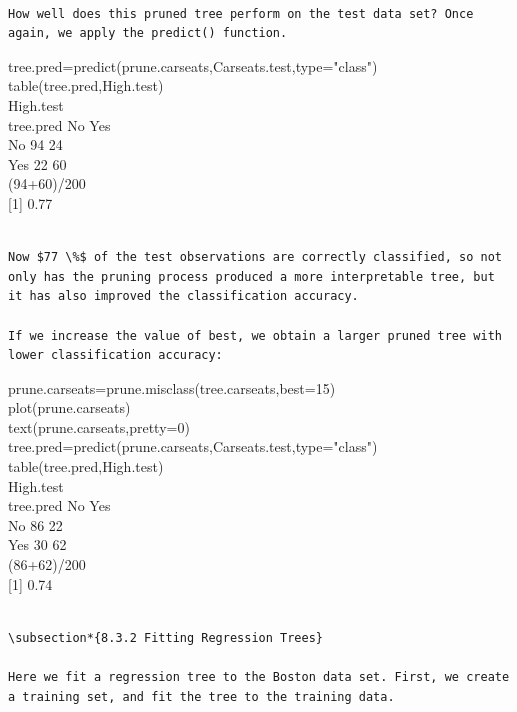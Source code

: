 \documentclass[10pt]{article}
\begin{document}
\begin{verbatim}

How well does this pruned tree perform on the test data set? Once again, we apply the predict() function.
\end{verbatim}

\begin{displayquote}
tree.pred=predict(prune.carseats,Carseats.test,type="class")\\
table(tree.pred,High.test)\\
High.test\\
tree.pred No Yes\\
No 94 24\\
Yes 22 60\\
(94+60)/200\\[0pt]
[1] 0.77
\end{displayquote}

\begin{verbatim}

Now $77 \%$ of the test observations are correctly classified, so not only has the pruning process produced a more interpretable tree, but it has also improved the classification accuracy.

If we increase the value of best, we obtain a larger pruned tree with lower classification accuracy:
\end{verbatim}

\begin{displayquote}
prune.carseats=prune.misclass(tree.carseats,best=15)\\
plot(prune.carseats)\\
text(prune.carseats,pretty=0)\\
tree.pred=predict(prune.carseats,Carseats.test,type="class")\\
table(tree.pred,High.test)\\
High.test\\
tree.pred No Yes\\
No 86 22\\
Yes 30 62\\
(86+62)/200\\[0pt]
[1] 0.74
\end{displayquote}

\begin{verbatim}

\subsection*{8.3.2 Fitting Regression Trees}

Here we fit a regression tree to the Boston data set. First, we create a training set, and fit the tree to the training data.
\end{verbatim}
\end{document}
